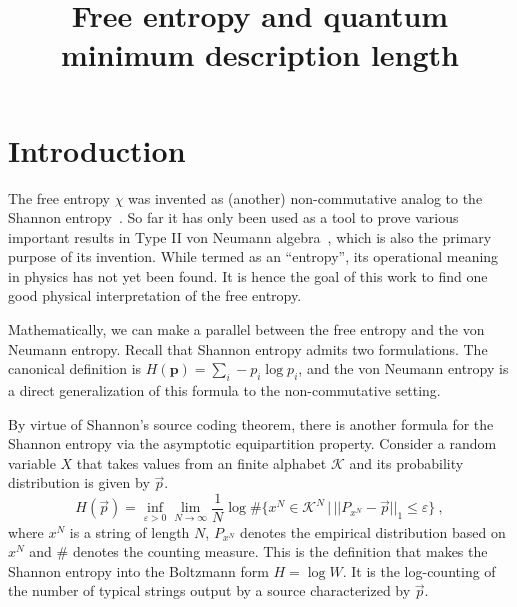 \documentclass[11pt,letterpaper]{article}
\title{Free entropy and quantum minimum description length}
\def\eps{\varepsilon}
\begin{document}
\maketitle


\section{Introduction}
The free entropy $\chi$ was invented as (another) non-commutative analog to the Shannon entropy~\cite{voiculescu1993analogues,voiculescu1994analogues,voiculescu1996analogues,voiculescu1998analogues,voiculescu1999analogues}.  So far it has only been used as a tool to prove various important results in Type II von Neumann algebra~\cite{voiculescu1996analogues,ge1997applications,ge1998applications}, which is also the primary purpose of its invention. While termed as an ``entropy'', its operational meaning in physics has not yet been found. It is hence the goal of this work to find one good physical interpretation of the free entropy.

Mathematically, we can make a parallel between the free entropy and the von Neumann entropy. Recall that Shannon entropy admits two formulations. The canonical definition is $H(\mathbf{p})=\sum_i -p_i\log p_i$, and the von Neumann entropy is a direct generalization of this formula to the non-commutative setting.

By virtue of Shannon's source coding theorem, there is another formula for the Shannon entropy via the asymptotic equipartition property. Consider a random variable $X$ that takes values from an finite alphabet $\mathcal{K}$ and its probability distribution is given by $\vec p$.
\begin{equation}\label{eq:aep}
    H(\vec{p})=\inf_{\eps>0}\lim_{N\to\infty}\frac1N\log \#\{ x^N\in \mathcal{K}^N \, \big\vert\, ||P_{x^N}-\vec{p}||_1\le\eps \}\ ,
\end{equation}
where $x^N$ is a string of length $N$, $P_{x^N}$ denotes the empirical distribution based on $x^N$ and $\#$ denotes the counting measure. This is the definition that makes the Shannon entropy into the Boltzmann form $H=\log W$. It is the log-counting of the number of typical strings output by a source characterized by $\vec{p}$. 
\end{document}
